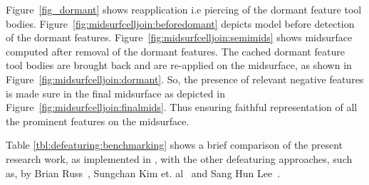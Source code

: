 Figure~\ref{fig_dormant} shows reapplication i.e piercing of the dormant feature tool bodies. Figure~\ref{fig:midsurfcelljoin:beforedomant} depicts model before detection of the dormant features. Figure~\ref{fig:midsurfcelljoin:semimids} shows midsurface computed after removal of the dormant features. The cached dormant feature tool bodies are brought back and are re-applied on the midsurface, as shown in Figure~\ref{fig:midsurfcelljoin:dormant}. So, the presence of relevant negative features is made sure in the final midsurface as depicted in Figure~\ref{fig:midsurfcelljoin:finalmids}. Thus ensuring faithful representation of all the prominent features on the midsurface. 
%
%


Table \ref{tbl:defeaturing:benchmarking} shows a brief comparison of the present research work, as implemented in \mysystemname, with the other defeaturing approaches, such as, by Brian Russ~\cite{Russ2012},  Sungchan Kim et. al~\cite{Kim2005} and Sang Hun Lee~\cite{Lee2005}.


